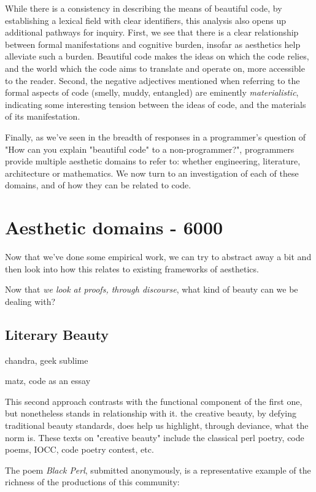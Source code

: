 While there is a consistency in describing the means of beautiful code, by establishing a lexical field with clear identifiers, this analysis also opens up additional pathways for inquiry. First, we see that there is a clear relationship between formal manifestations and cognitive burden, insofar as aesthetics help alleviate such a burden. Beautiful code makes the ideas on which the code relies, and the world which the code aims to translate and operate on, more accessible to the reader. Second, the negative adjectives mentioned when referring to the formal aspects of code (smelly, muddy, entangled) are eminently \emph{materialistic}, indicating some interesting tension between the ideas of code, and the materials of its manifestation.

Finally, as we've seen in the breadth of responses in a programmer's question of "How can you explain "beautiful code" to a non-programmer?"\cite{how_2013a}, programmers provide multiple aesthetic domains to refer to: whether engineering, literature, architecture or mathematics. We now turn to an investigation of each of these domains, and of how they can be related to code.

\pagebreak

\section{Aesthetic domains  - 6000}

Now that we've done some empirical work, we can try to abstract away a bit and then look into how this relates to existing frameworks of aesthetics.

Now that \emph{we look at proofs, through discourse}, what kind of beauty can we be dealing with?

\subsection{Literary Beauty}

chandra, geek sublime

matz, code as an essay

This second approach contrasts with the functional component of the first one, but nonetheless stands in relationship with it. the creative beauty, by defying traditional beauty standards, does help us highlight, through deviance, what the norm is. These texts on "creative beauty" include the classical perl poetry, code poems, IOCC, code poetry contest, etc.

The poem \emph{Black Perl}, submitted anonymously, is a representative example of the richness of the productions of this community:

